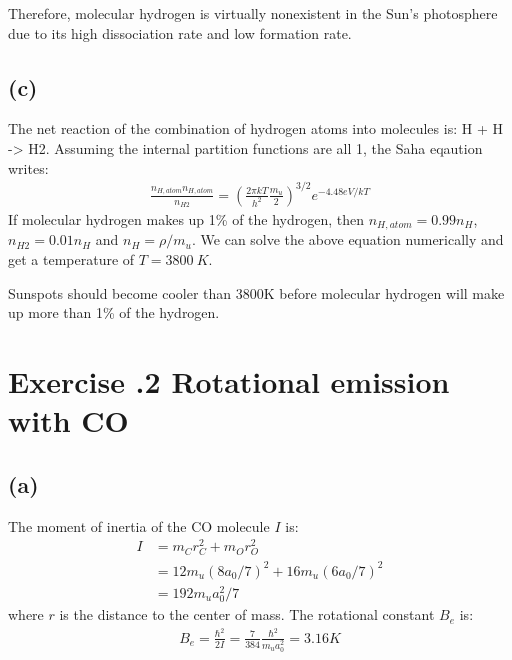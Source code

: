 \documentclass[a4paper,12pt]{article}
\begin{document}
Therefore, molecular hydrogen is virtually nonexistent in the Sun's photosphere due to its high dissociation rate and low formation rate.

\subsection*{(c)}
The net reaction of the combination of hydrogen atoms into molecules is: H + H -> H2.
Assuming the internal partition functions are all 1, the Saha eqaution writes:
\begin{align*}
    \frac{n_{H, atom} n_{H, atom}}{n_{H2}} = (\frac{2\pi kT}{h^2} \frac{m_u}{2})^{3/2} e^{-4.48eV/kT}
\end{align*}
If molecular hydrogen makes up 1\% of the hydrogen, then $n_{H, atom} = 0.99 n_H$, $n_{H2} = 0.01 n_H$ and $n_H = \rho/m_u$.
We can solve the above equation numerically and get a temperature of $T=3800\ K$.

Sunspots should become cooler than 3800K before molecular hydrogen will make 
up more than 1\% of the hydrogen.

\section*{\textbf{Exercise \uppercase\expandafter{}.2 Rotational emission with CO}}
\subsection*{(a)}
The moment of inertia of the CO molecule $I$ is:
\begin{align*}
    I &= m_C r_C^2 + m_O r_O^2 \\
      &= 12 m_u (8a_0/7)^2 + 16 m_u (6a_0 /7)^2 \\
      &= 192m_u a_0^2/7 
\end{align*}
where $r$ is the distance to the center of mass.
The rotational constant $B_e$ is:
\begin{align*}
    B_e = \frac{\hbar^2}{2I} = \frac{7}{384}\frac{\hbar^2}{m_ua_0^2} = 3.16 K
\end{align*}
\end{document}
